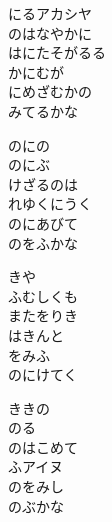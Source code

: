 \documentclass[10pt,b5j]{tarticle} %
\begin{document}
\vspace{1.5em} %
\newcommand{\linespace}{0.5em} %
\newcommand{\blocksize}{0.5\hsize} %
\begin{enumerate} %
    \begin{minipage}[c]{\blocksize}
    
        \vspace{\linespace}
        \item
        にるアカシヤ\\
        のはなやかに\\
        はにたそがるる\\
        かにむが\\
        にめざむかの\\
        みてるかな
        
        \vspace{\linespace}
        \item
        のにの\\
        のにぶ\\
        けざるのは\\
        れゆくにうく\\
        のにあびて\\
        のをふかな
        
        \vspace{\linespace}
        \item
        きや\\
        ふむしくも\\
        またをりき\\
        はきんと\\
        をみふ\\
        のにけてく
        
        \vspace{\linespace}
        \item
        ききの\\
        のる\\
        のはこめて\\
        ふアイヌ\\
        のをみし\\
        のぶかな
    
    \end{minipage}
\end{enumerate} %
\end{document}
